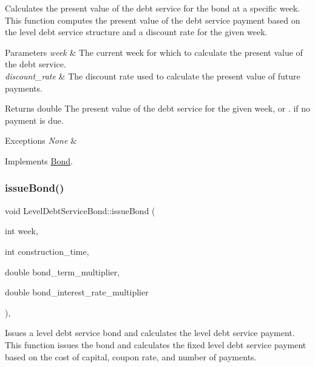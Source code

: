 Calculates the present value of the debt service for the bond at a specific week. This function computes the present value of the debt service payment based on the level debt service structure and a discount rate for the given week. 


\begin{DoxyParams}{Parameters}
{\em week} & The current week for which to calculate the present value of the debt service. \\
\hline
{\em discount\+\_\+rate} & The discount rate used to calculate the present value of future payments.\\
\hline
\end{DoxyParams}
\begin{DoxyReturn}{Returns}
double The present value of the debt service for the given week, or {.} if no payment is due.
\end{DoxyReturn}

\begin{DoxyExceptions}{Exceptions}
{\em None} & \\
\hline
\end{DoxyExceptions}


Implements \mbox{\hyperlink{classBond_a322d4ab0c0c72824ac4df5df80f14d24}{Bond}}.

\mbox{\label{classLevelDebtServiceBond_a51a54a1a25be105b168bf86489aee417}} 
\subsubsection{\texorpdfstring{issue\+Bond()}{issueBond()}}
{\footnotesize\ttfamily void Level\+Debt\+Service\+Bond\+::issue\+Bond (\begin{DoxyParamCaption}\item[{int}]{week,  }\item[{int}]{construction\+\_\+time,  }\item[{double}]{bond\+\_\+term\+\_\+multiplier,  }\item[{double}]{bond\+\_\+interest\+\_\+rate\+\_\+multiplier }\end{DoxyParamCaption})\hspace{0.3cm}{\ttfamily [override]}, {\ttfamily [virtual]}}



Issues a level debt service bond and calculates the level debt service payment. This function issues the bond and calculates the fixed level debt service payment based on the cost of capital, coupon rate, and number of payments. 



